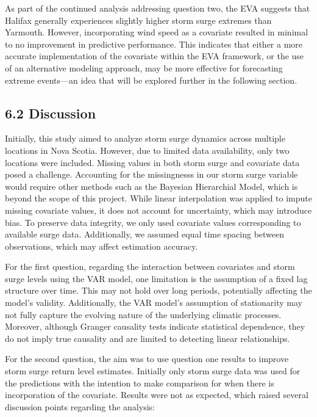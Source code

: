 \documentclass[
  letterpaper,
  DIV=11,
  numbers=noendperiod]{scrartcl}
\begin{document}
As part of the continued analysis addressing question two, the EVA
suggests that Halifax generally experiences slightly higher storm surge
extremes than Yarmouth. However, incorporating wind speed as a covariate
resulted in minimal to no improvement in predictive performance. This
indicates that either a more accurate implementation of the covariate
within the EVA framework, or the use of an alternative modeling
approach, may be more effective for forecasting extreme events---an idea
that will be explored further in the following section.

\subsection{6.2 Discussion}\label{discussion}

Initially, this study aimed to analyze storm surge dynamics across
multiple locations in Nova Scotia. However, due to limited data
availability, only two locations were included. Missing values in both
storm surge and covariate data posed a challenge. Accounting for the
missingnesss in our storm surge variable would require other methods
such as the Bayesian Hierarchial Model, which is beyond the scope of
this project. While linear interpolation was applied to impute missing
covariate values, it does not account for uncertainty, which may
introduce bias. To preserve data integrity, we only used covariate
values corresponding to available surge data. Additionally, we assumed
equal time spacing between observations, which may affect estimation
accuracy.

For the first question, regarding the interaction between covariates and
storm surge levels using the VAR model, one limitation is the assumption
of a fixed lag structure over time. This may not hold over long periods,
potentially affecting the model's validity. Additionally, the VAR
model's assumption of stationarity may not fully capture the evolving
nature of the underlying climatic processes. Moreover, although Granger
causality tests indicate statistical dependence, they do not imply true
causality and are limited to detecting linear relationships.

For the second question, the aim was to use question one results to
improve storm surge return level estimates. Initially only storm surge
data was used for the predictions with the intention to make comparison
for when there is incorporation of the covariate. Results were not as
expected, which raised several discussion points regarding the analysis:
\end{document}
